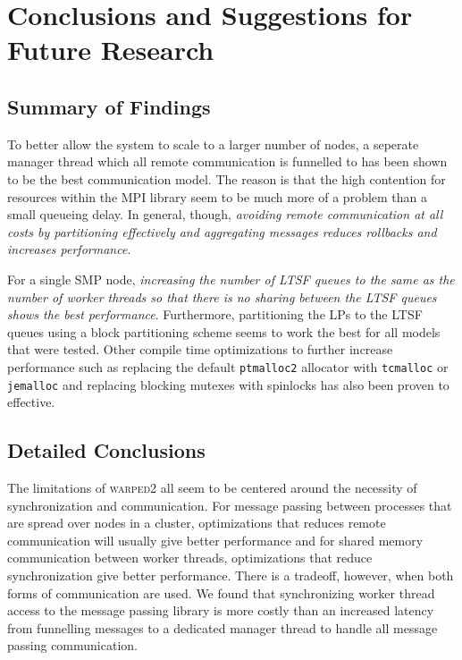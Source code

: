 \documentclass[11pt]{book}
\begin{document}
\chapter[Conclusions \& Future Research]{Conclusions and Suggestions for Future Research}
\label{conclude}

\section{Summary of Findings}

To better allow the system to scale to a larger number of nodes, a seperate manager thread which all
remote communication is funnelled to has been shown to be the best communication model.  The reason
is that the high contention for resources within the MPI library seem to be much more of a problem
than a small queueing delay.  In general, though, \emph{avoiding remote communication at all costs
  by partitioning effectively and aggregating messages reduces rollbacks and increases performance}.

For a single SMP node, \emph{increasing the number of LTSF queues to the same as the number of
  worker threads so that there is no sharing between the LTSF queues shows the best performance}.
Furthermore, partitioning the LPs to the LTSF queues using a block partitioning scheme seems to work
the best for all models that were tested.  Other compile time optimizations to further increase
performance such as replacing the default \texttt{ptmalloc2} allocator with \texttt{tcmalloc} or
\texttt{jemalloc} and replacing blocking mutexes with spinlocks has also been proven to effective. 

\section{Detailed Conclusions}

The limitations of \textsc{warped2} all seem to be centered around the necessity of synchronization
and communication.  For message passing between processes that are spread over nodes in a cluster,
optimizations that reduces remote communication will usually give better performance and for shared
memory communication between worker threads, optimizations that reduce synchronization give better
performance.  There is a tradeoff, however, when both forms of communication are used.  We found
that synchronizing worker thread access to the message passing library is more costly than an
increased latency from funnelling messages to a dedicated manager thread to handle all message
passing communication.
\end{document}
